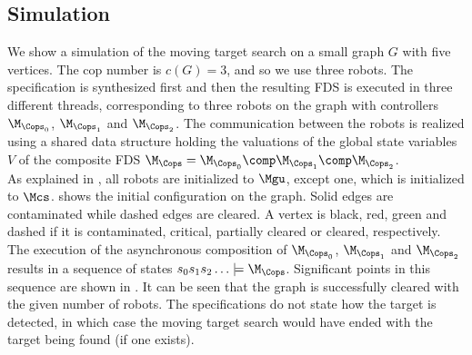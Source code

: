 \subsection{Simulation}

We show a simulation of the moving target search on a small graph $G$ with five vertices. The cop number is $c(G) = 3$, and so we use three robots. The specification is synthesized first and then the resulting FDS is executed in three different threads, corresponding to three robots on the graph  with controllers $\M_{\Cops_0}$, $\M_{\Cops_1}$ and $\M_{\Cops_2}$. The communication between the robots is realized using a shared data structure holding the valuations of the global state variables $V$ of the composite FDS $\M_\Cops = \M_{\Cops_0} \comp \M_{\Cops_1} \comp \M_{\Cops_2}$.\\

As explained in , all robots are initialized to $\Mgu$, except one, which is initialized to $\Mcs$.  shows the initial configuration on the graph. Solid edges are contaminated while dashed edges are cleared. A vertex is black, red, green and dashed if it is contaminated, critical, partially cleared or cleared, respectively.\\

The execution of the asynchronous composition of $\M_{\Cops_0}$, $\M_{\Cops_1}$ and $\M_{\Cops_2}$ results in a sequence of states $s_0s_1s_2\ldots \models \M_{\Cops}$. Significant points in this sequence are shown in . It can be seen that the graph is successfully cleared with the given number of robots. The specifications do not state how the target is detected, in which case the moving target search would have ended with the target being found (if one exists).\\

\newcommand{\fsize}{\tiny}
\newcommand{\rlabel}[3]{\psfrag{#1}[cc][cc]{\fsize{$R_{#2}\!\!:$#3}}}
\newcommand{\subst}{
	\psfrag{(0)}[cc][cc]{\fsize{$v_0$}}
	\psfrag{(1)}[cc][cc]{\fsize{$v_1$}}
	\psfrag{(2)}[cc][cc]{\fsize{$v_2$}}
	\psfrag{(3)}[cc][cc]{\fsize{$v_3$}}
	\psfrag{(4)}[cc][cc]{\fsize{$v_4$}}
	\rlabel{R0:-1}{0}{$\mgu$}
	\rlabel{R1:-1}{1}{$\mgu$}
	\rlabel{R2:-1}{2}{$\mgu$}
	\rlabel{R0:0}{0}{$\mcs$}
	\rlabel{R1:0}{1}{$\mcs$}
	\rlabel{R2:0}{2}{$\mcs$}
	\rlabel{R0:1}{0}{$\mcl$}
	\rlabel{R1:1}{1}{$\mcl$}
	\rlabel{R2:1}{2}{$\mcl$}
	\rlabel{R0:2}{0}{$\mpc$}
	\rlabel{R1:2}{1}{$\mpc$}
	\rlabel{R2:2}{2}{$\mpc$}
}

\newcommand{\fwidth}{0.45\textwidth}
\newcommand{\statefig}[3]{
	\subfigure[$s_{#1}$: #3]{
	\subst
	\texttt{[image: state0\#2.eps]}
	\label{fig:s#1}
	}
}

